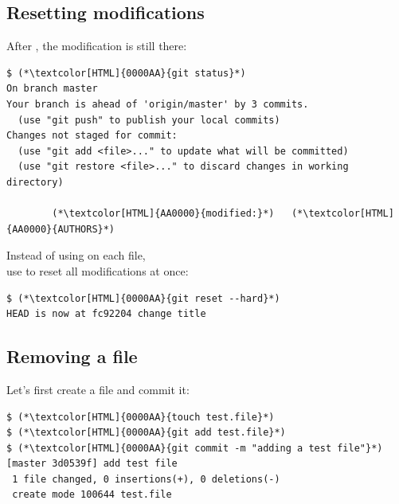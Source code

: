 \subsection{Resetting modifications}
\begin{frame}[fragile]
\subslidetitle
  After , the modification is still there:
\begin{lstlisting}
$ (*\textcolor[HTML]{0000AA}{git status}*)
On branch master
Your branch is ahead of 'origin/master' by 3 commits.
  (use "git push" to publish your local commits)
Changes not staged for commit:
  (use "git add <file>..." to update what will be committed)
  (use "git restore <file>..." to discard changes in working directory)

        (*\textcolor[HTML]{AA0000}{modified:}*)   (*\textcolor[HTML]{AA0000}{AUTHORS}*)
\end{lstlisting}

  Instead of using  on each file, \\
  use  to reset all modifications at once:
\begin{lstlisting}
$ (*\textcolor[HTML]{0000AA}{git reset --hard}*)
HEAD is now at fc92204 change title
\end{lstlisting}
\end{frame}

\subsection{Removing a file}
\begin{frame}[fragile]
\subslidetitle
  Let's first create a file and commit it:
\begin{lstlisting}
$ (*\textcolor[HTML]{0000AA}{touch test.file}*)
$ (*\textcolor[HTML]{0000AA}{git add test.file}*)
$ (*\textcolor[HTML]{0000AA}{git commit -m "adding a test file"}*)
[master 3d0539f] add test file
 1 file changed, 0 insertions(+), 0 deletions(-)
 create mode 100644 test.file
\end{lstlisting}
\end{frame}

